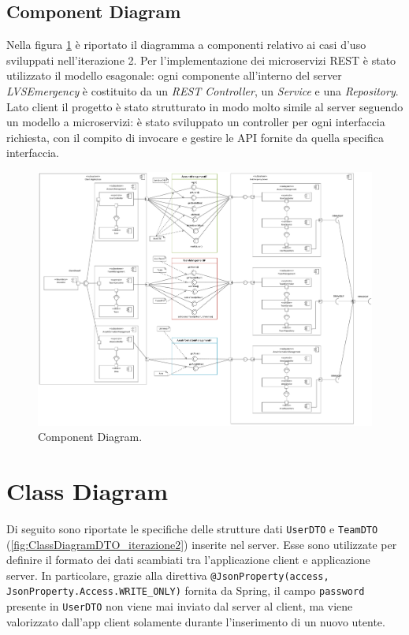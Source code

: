 \begin{landscape}
	\section{Component Diagram}
	Nella figura \ref{fig:ComponentDiagram_iterazione2} è riportato il diagramma a componenti relativo ai casi d'uso sviluppati nell'iterazione 2. Per l'implementazione dei microservizi REST è stato utilizzato il modello esagonale: ogni componente all'interno del server \textit{LVSEmergency} è costituito da un \textit{REST Controller}, un \textit{Service} e una \textit{Repository}.
	Lato client il progetto è stato strutturato in modo molto simile al server seguendo un modello a microservizi: è stato sviluppato un controller per ogni interfaccia richiesta, con il compito di invocare e gestire le API fornite da quella specifica interfaccia. 
	
	\begin{figure}[tbh!]
		\centering
		\includegraphics[width=0.7\linewidth]{./Iterazione 2/OtherFiles/UML - Component View}
		\caption{Component Diagram.}
		\label{fig:ComponentDiagram_iterazione2}
	\end{figure}
\end{landscape}

\clearpage

\section{Class Diagram}
Di seguito sono riportate le specifiche delle strutture dati \texttt{UserDTO} e \texttt{TeamDTO} (\Fig\ref{fig:ClassDiagramDTO_iterazione2}) inserite nel server. Esse sono utilizzate per definire il formato dei dati scambiati tra l'applicazione client e applicazione server. In particolare, grazie alla direttiva \texttt{@JsonProperty(access, JsonProperty.Access.WRITE\_ONLY)} fornita da Spring, il campo \texttt{password} presente in \texttt{UserDTO} non viene mai inviato dal server al client, ma viene valorizzato dall'app client solamente durante l'inserimento di un nuovo utente.  

